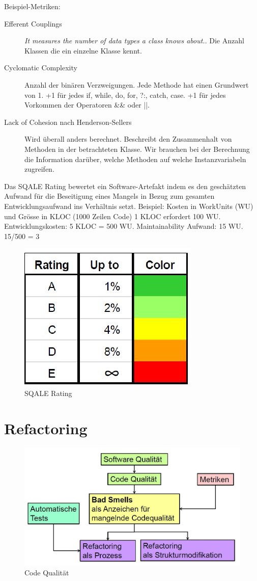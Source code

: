 Beispiel-Metriken:
\begin{description}
	\item[Efferent Couplings] \textit{It measures the number of data types a class knows about.}. Die Anzahl Klassen die ein einzelne Klasse kennt.
	
	\item[Cyclomatic Complexity] Anzahl der binären Verzweigungen. Jede Methode hat einen Grundwert von 1. +1 für jedes if, while, do, for, ?:, catch, case. +1 für jedes Vorkommen der Operatoren \&\& oder ||.
	
	\item[Lack of Cohesion nach Henderson-Sellers] Wird überall anders berechnet. Beschreibt den Zusammenhalt von Methoden in der betrachteten Klasse. Wir brauchen bei der Berechnung die Information darüber, welche Methoden auf welche Instanzvariabeln zugreifen.
\end{description}

Das SQALE Rating bewertet ein Software-Artefakt indem es den geschätzten Aufwand für die Beseitigung eines Mangels in Bezug zum gesamten Entwicklungsaufwand ins Verhältnis setzt. Beispiel: Kosten in WorkUnits (WU) und Grösse in KLOC (1000 Zeilen Code) 1 KLOC erfordert 100 WU. Entwicklungskosten: 5 KLOC = 500 WU. Maintainability Aufwand: 15 WU. 15/500 = 3%

\begin{figure}[h!]
\centering
\includegraphics[width=0.1\linewidth]{fig/sqale-rating}
\caption{SQALE Rating}
\label{fig:sqale-rating}
\end{figure}







\section{Refactoring}

\begin{figure}
	\centering
	\includegraphics[width=0.7\linewidth]{fig/fazit-refactoring}
	\caption{Code Qualität}
	\label{fig:fazit-refactoring}
\end{figure}

